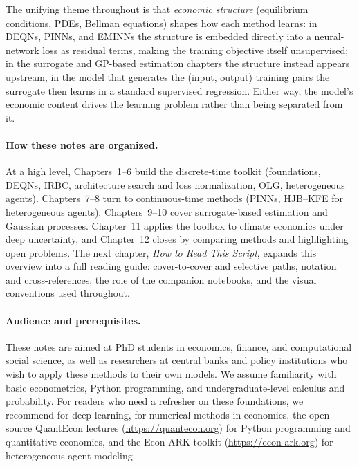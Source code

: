 \documentclass[11pt,a4paper]{report}
\begin{document}
The unifying theme throughout is that \emph{economic structure} (equilibrium conditions, PDEs, Bellman equations) shapes how each method learns: in DEQNs, PINNs, and EMINNs the structure is embedded directly into a neural-network loss as residual terms, making the training objective itself unsupervised; in the surrogate and GP-based estimation chapters the structure instead appears upstream, in the model that generates the (input, output) training pairs the surrogate then learns in a standard supervised regression. Either way, the model's economic content drives the learning problem rather than being separated from it.

\paragraph{How these notes are organized.}
At a high level, Chapters~1--6 build the discrete-time toolkit (foundations, DEQNs, IRBC, architecture search and loss normalization, OLG, heterogeneous agents). Chapters~7--8 turn to continuous-time methods (PINNs, HJB--KFE for heterogeneous agents). Chapters~9--10 cover surrogate-based estimation and Gaussian processes. Chapter~11 applies the toolbox to climate economics under deep uncertainty, and Chapter~12 closes by comparing methods and highlighting open problems. The next chapter, \emph{How to Read This Script}, expands this overview into a full reading guide: cover-to-cover and selective paths, notation and cross-references, the role of the companion notebooks, and the visual conventions used throughout.

\paragraph{Audience and prerequisites.}
These notes are aimed at PhD students in economics, finance, and computational social science, as well as researchers at central banks and policy institutions who wish to apply these methods to their own models.  We assume familiarity with basic econometrics, Python programming, and undergraduate-level calculus and probability.  For readers who need a refresher on these foundations, we recommend \citet{goodfellow2016deep} for deep learning, \citet{judd1998numerical} for numerical methods in economics, the open-source QuantEcon lectures (\url{https://quantecon.org}) for Python programming and quantitative economics, and the Econ-ARK toolkit (\url{https://econ-ark.org}) for heterogeneous-agent modeling.
\end{document}

